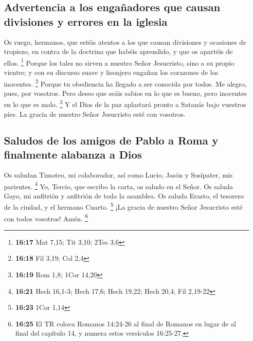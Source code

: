 \begin{paracol}{2}
\hypertarget{advertencia-a-los-engauxf1adores-que-causan-divisiones-y-errores-en-la-iglesia}{%
\subsection{Advertencia a los engañadores que causan divisiones y
errores en la
iglesia}\label{advertencia-a-los-engauxf1adores-que-causan-divisiones-y-errores-en-la-iglesia}}

 Os ruego, hermanos, que estéis atentos a los que causan
divisiones y ocasiones de tropiezo, en contra de la doctrina que habéis
aprendido, y que os apartéis de ellos. \footnote{\textbf{16:17} Mat
  7,15; Tit 3,10; 2Tes 3,6}  Porque los tales no sirven a
nuestro Señor Jesucristo, sino a su propio vientre; y con su discurso
suave y lisonjero engañan los corazones de los inocentes. \footnote{\textbf{16:18}
  Fil 3,19; Col 2,4}  Porque tu obediencia ha llegado a
ser conocida por todos. Me alegro, pues, por vosotros. Pero deseo que
seáis sabios en lo que es bueno, pero inocentes en lo que es malo.
\footnote{\textbf{16:19} Rom 1,8; 1Cor 14,20}  Y el Dios
de la paz aplastará pronto a Satanás bajo vuestros pies. La gracia de
nuestro Señor Jesucristo esté con vosotros.

\hypertarget{saludos-de-los-amigos-de-pablo-a-roma-y-finalmente-alabanza-a-dios}{%
\subsection{Saludos de los amigos de Pablo a Roma y finalmente alabanza
a
Dios}\label{saludos-de-los-amigos-de-pablo-a-roma-y-finalmente-alabanza-a-dios}}

 Os saludan Timoteo, mi colaborador, así como Lucio,
Jasón y Sosípater, mis parientes. \footnote{\textbf{16:21} Hech 16,1-3;
  Hech 17,6; Hech 19,22; Hech 20,4; Fil 2,19-22}  Yo,
Tercio, que escribo la carta, os saludo en el Señor.  Os
saluda Gayo, mi anfitrión y anfitrión de toda la asamblea. Os saluda
Erasto, el tesorero de la ciudad, y el hermano Cuarto. \footnote{\textbf{16:23}
  1Cor 1,14}  ¡La gracia de nuestro Señor Jesucristo esté
con todos vosotros! Amén.  \footnote{\textbf{16:25} El TR
  coloca Romanos 14:24-26 al final de Romanos en lugar de al final del
  capítulo 14, y numera estos versículos 16:25-27.} \switchcolumn
\begin{otherlanguage}{english}


\end{otherlanguage}
\end{paracol}
